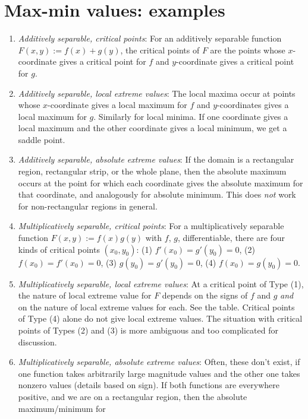 \documentclass[10pt]{amsart}
\begin{document}
\section{Max-min values: examples}

\begin{enumerate}
\item {\em Additively separable, critical points}: For an additively
  separable function $F(x,y) := f(x) + g(y)$, the critical points of
  $F$ are the points whose $x$-coordinate gives a critical point for
  $f$ and $y$-coordinate gives a critical point for $g$.
\item {\em Additively separable, local extreme values}: The local
  maxima occur at points whose $x$-coordinate gives a local maximum
  for $f$ and $y$-coordinates gives a local maximum for $g$. Similarly
  for local minima. If one coordinate gives a local maximum and the
  other coordinate gives a local minimum, we get a saddle point.
\item {\em Additively separable, absolute extreme values}: If the
  domain is a rectangular region, rectangular strip, or the whole
  plane, then the absolute maximum occurs at the point for which each
  coordinate gives the absolute maximum for that coordinate, and
  analogously for absolute minimum. This does {\em not} work for
  non-rectangular regions in general.
\item {\em Multiplicatively separable, critical points}: For a
  multiplicatively separable function $F(x,y) := f(x)g(y)$ with $f$,
  $g$, differentiable, there are four kinds of critical points
  $(x_0,y_0)$: (1) $f'(x_0) = g'(y_0) = 0$, (2) $f(x_0) = f'(x_0) =
  0$, (3) $g(y_0) = g'(y_0) = 0$, (4) $f(x_0) = g(y_0) = 0$.
\item {\em Multiplicatively separable, local extreme values}: At a
  critical point of Type (1), the nature of local extreme value for
  $F$ depends on the signs of $f$ and $g$ {\em and} on the nature of
  local extreme values for each. See the table. Critical points of
  Type (4) alone do not give local extreme values. The situation with
  critical points of Types (2) and (3) is more ambiguous and too
  complicated for discussion.
\item {\em Multiplicatively separable, absolute extreme values}:
  Often, these don't exist, if one function takes arbitrarily large
  magnitude values and the other one takes nonzero values (details
  based on sign). If both functions are everywhere positive, and we
  are on a rectangular region, then the absolute maximum/minimum for

\end{enumerate}
\end{document}
